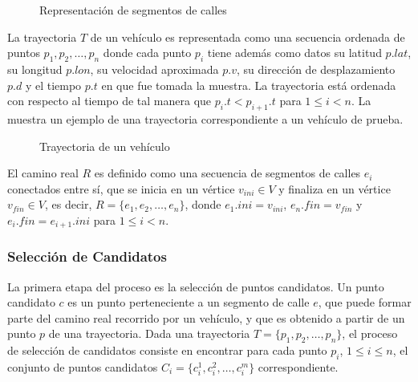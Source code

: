\begin{figure}[h*]
	\centering
	
	\caption{\label{fig:segmentos_de_calle} Representación de segmentos de calles}	
\end{figure}

La trayectoria $T$ de un vehículo es representada como una secuencia ordenada de puntos $p_1, p_2, \dots, p_n$ donde cada punto $p_i$ tiene además como datos su latitud $p.lat$, su longitud $p.lon$, su velocidad aproximada $p.v$, su dirección de desplazamiento $p.d$ y el tiempo $p.t$ en que fue tomada la muestra. La trayectoria está ordenada con respecto al tiempo de tal manera que $p_i.t < p_{i + 1}.t$ para $1 \le i < n$. La  muestra un ejemplo de una trayectoria correspondiente a un vehículo de prueba.

\begin{figure}[h*]
	\centering
	
	\caption{\label{fig:trayectoria} Trayectoria de un vehículo}	
\end{figure}

El camino real $R$ es definido como una secuencia de segmentos de calles $e_i$ conectados entre sí, que se inicia en un vértice $v_{ini} \in V$ y finaliza en un vértice $v_{fin} \in V$, es decir, $R = \{ e_1, e_2, \dots, e_n \}$, donde $e_1.ini = v_{ini}$, $e_n.fin = v_{fin}$ y $e_i.fin = e_{i + 1}.ini$ para $1 \le i < n$.

\subsubsection{Selección de Candidatos}
\label{seleccion_de_candidatos}

La primera etapa del proceso es la selección de puntos candidatos. Un punto candidato $c$ es un punto perteneciente a un segmento de calle $e$, que puede formar parte del camino real recorrido por un vehículo, y que es obtenido a partir de un punto $p$ de una trayectoria. Dada una trayectoria $T = \{p_1, p_2, \dots, p_n\}$, el proceso de selección de candidatos consiste en encontrar para cada punto $p_i$, $1\le i\le n$, el conjunto de puntos candidatos $C_i = \{c_{i}^{1}, c_{i}^{2}, \dots, c_{i}^{m}\}$ correspondiente.

